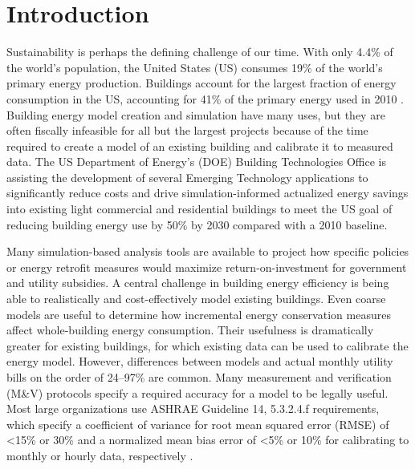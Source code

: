 \documentclass[preprint, review, 12pt]{elsarticle}
\begin{document}
\section{Introduction}
\label{sec:introduction}
Sustainability is perhaps the defining challenge of our time. With only 4.4\% of the world's population, the United States (US) consumes 19\% of the world's primary energy production. Buildings account for the largest fraction of energy consumption in the US, accounting for 41\% of the primary energy used in 2010 \cite{cit:doe2012a}. Building energy model creation and simulation have many uses, but they are often fiscally infeasible for all but the largest projects because of the time required to create a model of an existing building and calibrate it to measured data. The US Department of Energy's (DOE) Building Technologies Office is assisting the development of several Emerging Technology applications to significantly reduce costs and drive simulation-informed actualized energy savings into existing light commercial and residential buildings to meet the US goal of reducing building energy use by 50\% by 2030 compared with a 2010 baseline.

Many simulation-based analysis tools are available \cite{cit:doetools2012} to project how specific policies or energy retrofit measures \cite{Chidiac20115037} would maximize return-on-investment for government and utility subsidies. %
A central challenge in building energy efficiency is being able to realistically and cost-effectively model existing buildings. Even coarse models are useful to determine how incremental energy conservation measures affect whole-building energy consumption. Their usefulness is dramatically greater for existing buildings, for which existing data can be used to calibrate the energy model. However, differences between models and actual monthly utility bills on the order of 24--97\% \cite{cit:earthadvantage2009,cit:roberts2012} are common. Many measurement and verification (M\&V) protocols specify a required accuracy for a model to be legally useful. Most large organizations use ASHRAE Guideline 14, 5.3.2.4.f requirements, which specify a coefficient of variance for root mean squared error (RMSE) of \textless 15\% or 30\% and a normalized mean bias error of \textless 5\% or 10\% for calibrating to monthly or hourly data, respectively \cite{cit:ashrae2002}.
\end{document}

